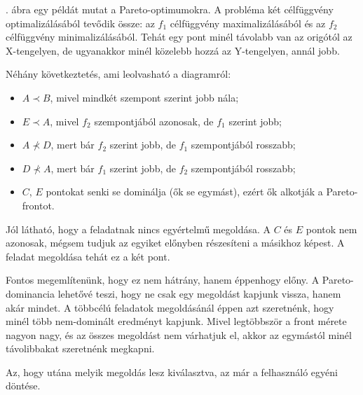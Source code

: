 \begin{pld}
  . ábra egy példát mutat a Pareto-optimumokra.
  A probléma két célfüggvény optimalizálásából tevődik össze: az $f_1$ célfüggvény maximalizálásából és az $f_2$ célfüggvény minimalizálásából.
  Tehát egy pont minél távolabb van az origótól az X-tengelyen, de ugyanakkor minél közelebb hozzá az Y-tengelyen, annál jobb.

  Néhány következtetés, ami leolvasható a diagramról:
  \begin{itemize}
    \item[\textbullet] $A \prec B$, mivel mindkét szempont szerint jobb nála;
    \item[\textbullet] $E \prec A$, mivel $f_2$ szempontjából azonosak, de $f_1$ szerint jobb;
    \item[\textbullet] $A \nprec D$, mert bár $f_2$ szerint jobb, de $f_1$ szempontjából rosszabb;
    \item[\textbullet] $D \nprec A$, mert bár $f_1$ szerint jobb, de $f_2$ szempontjából rosszabb;
    \item[\textbullet] $C$, $E$ pontokat senki se dominálja (ők se egymást), ezért ők alkotják a Pareto-frontot.
  \end{itemize}

  Jól látható, hogy a feladatnak nincs egyértelmű megoldása.
  A $C$ és $E$ pontok nem azonosak, mégsem tudjuk az egyiket előnyben részesíteni a másikhoz képest.
  A feladat megoldása tehát ez a két pont.
\end{pld}

\begin{meg}
  Fontos megemlítenünk, hogy ez nem hátrány, hanem éppenhogy előny.
  A Pareto-dominancia lehetővé teszi, hogy ne csak egy megoldást kapjunk vissza, hanem akár mindet.
  A többcélú feladatok megoldásánál éppen azt szeretnénk, hogy minél több nem-dominált eredményt kapjunk.
  Mivel legtöbbször a front mérete nagyon nagy, és az összes megoldást nem várhatjuk el, akkor az egymástól minél távolibbakat szeretnénk megkapni.

  Az, hogy utána melyik megoldás lesz kiválasztva, az már a felhasználó egyéni döntése.
\end{meg}

